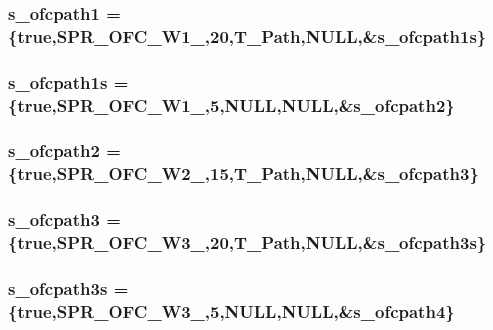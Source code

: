 \label{WL__ACT2_8C_aa5e50151f6cdf0e49996440f74ad691d}
\hypertarget{WL__ACT2_8C_a29992c9719ce8a66a95f69e0833eeb07}{
\subsubsection[{s\_\-ofcpath1}]{ {\bf s\_\-ofcpath1} = \{true,SPR\_\-OFC\_\-W1\_,20,T\_\-Path,NULL,\&{\bf s\_\-ofcpath1s}\}}}
\label{WL__ACT2_8C_a29992c9719ce8a66a95f69e0833eeb07}
\hypertarget{WL__ACT2_8C_a6fb294b7e1de7d6d5a785903fce9952d}{
\subsubsection[{s\_\-ofcpath1s}]{ {\bf s\_\-ofcpath1s} = \{true,SPR\_\-OFC\_\-W1\_,5,NULL,NULL,\&{\bf s\_\-ofcpath2}\}}}
\label{WL__ACT2_8C_a6fb294b7e1de7d6d5a785903fce9952d}
\hypertarget{WL__ACT2_8C_a90e98fd84e585f813ddd1a343605cacc}{
\subsubsection[{s\_\-ofcpath2}]{ {\bf s\_\-ofcpath2} = \{true,SPR\_\-OFC\_\-W2\_,15,T\_\-Path,NULL,\&{\bf s\_\-ofcpath3}\}}}
\label{WL__ACT2_8C_a90e98fd84e585f813ddd1a343605cacc}
\hypertarget{WL__ACT2_8C_af823cd8629d121bbcd71e39e9dd61bf6}{
\subsubsection[{s\_\-ofcpath3}]{ {\bf s\_\-ofcpath3} = \{true,SPR\_\-OFC\_\-W3\_,20,T\_\-Path,NULL,\&{\bf s\_\-ofcpath3s}\}}}
\label{WL__ACT2_8C_af823cd8629d121bbcd71e39e9dd61bf6}
\hypertarget{WL__ACT2_8C_a6601566ef7b73539b95e3bdc9d8de72f}{
\subsubsection[{s\_\-ofcpath3s}]{ {\bf s\_\-ofcpath3s} = \{true,SPR\_\-OFC\_\-W3\_,5,NULL,NULL,\&{\bf s\_\-ofcpath4}\}}}
